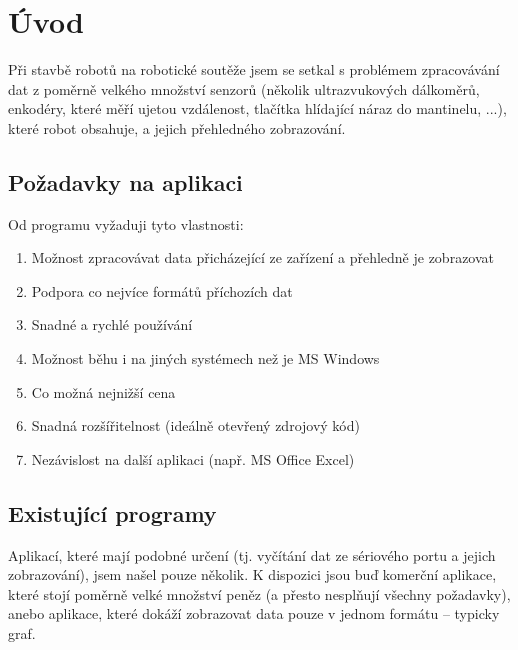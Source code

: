 \documentclass[12pt, a4paper, oneside]{article}
\begin{document}
\tableofcontents  %

\addtolength{\textheight}{-30mm} %
\newpage
\setlength{\voffset}{0mm} %
\pagestyle{plain}
\section*{Úvod}

Při stavbě robotů na robotické soutěže jsem se setkal s problémem zpracovávání dat z poměrně velkého množství senzorů (několik ultrazvukových dálkoměrů, enkodéry, které měří ujetou vzdálenost, tlačítka hlídající náraz do mantinelu, ...), které robot obsahuje, a jejich přehledného zobrazování. 
\subsection*{Požadavky na aplikaci}
Od programu vyžaduji tyto vlastnosti:
\begin{enumerate}
    \item Možnost zpracovávat data přicházející ze zařízení a přehledně je zobrazovat %
    \item Podpora co nejvíce formátů příchozích dat %
    \item Snadné a rychlé používání %
    \item Možnost běhu i na jiných systémech než je MS Windows %
    \item Co možná nejnižší cena %
    \item Snadná rozšířitelnost (ideálně otevřený zdrojový kód) %
    \item Nezávislost na další aplikaci (např. MS Office Excel) %
\end{enumerate}


\subsection*{Existující programy}
Aplikací, které mají podobné určení (tj. vyčítání dat ze sériového portu a jejich zobrazování), jsem našel pouze několik. K dispozici jsou buď komerční aplikace, které stojí poměrně velké množství peněz (a přesto nesplňují všechny požadavky), anebo aplikace, které dokáží zobrazovat data pouze v jednom formátu -- typicky graf.
\end{document}

